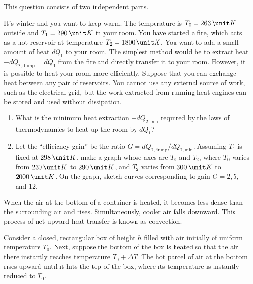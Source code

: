 \documentclass[11pt]{scrartcl}
\begin{document}
\begin{prob}[USAPhO 2021/B2]
    This question consists of two independent parts.
    \begin{anum}
        \item It’s winter and you want to keep warm. The temperature is $T_0 = 263\,\unit K$ outside and $T_1 = 290 \,\unit K$ in your room. You have started a fire, which acts as a hot reservoir at temperature $T_2 = 1800\,\unit K$. You want to add a small amount of heat $dQ_1$ to your room. The simplest method would be to extract heat $-dQ_{2,\text{dump}} = dQ_1$ from the fire and directly transfer it to your room. However, it is possible to heat your room more efficiently. Suppose that you can exchange heat between any pair of reservoirs. You cannot use any external source of work, such as the electrical grid, but the work extracted from running heat engines can be stored and used without dissipation.
        \begin{enumerate}[label=\roman*.]
            \item What is the minimum heat extraction $-dQ_{2,\text{min}}$ required by the laws of thermodynamics to heat up the room by $dQ_1$?
            \item Let the ``efficiency gain'' be the ratio $G=  dQ_{2,\text{dump}}/dQ_{2,\text{min}}$. Assuming $T_1$ is fixed at $298\,\unit K$, make a graph whose axes are $T_0$ and $T_2$, where $T_0$ varies from $230 \, \unit K$ to $290 \, \unit K$, and $T_2$ varies from $300 \, \unit K$ to $2000 \, \unit K$. On the graph, sketch curves corresponding to gain $G = 2,5$, and $12$.
        \end{enumerate}
        \item When the air at the bottom of a container is heated, it becomes less dense than the surrounding
air and rises. Simultaneously, cooler air falls downward. This process of net upward heat transfer
is known as convection.

Consider a closed, rectangular box of height $h$ filled with air initially of uniform temperature $T_0$.
Next, suppose the bottom of the box is heated so that the air there instantly reaches temperature
$T_0 +\Delta T$. The hot parcel of air at the bottom rises upward until it hits the top of the box, where
its temperature is instantly reduced to $T_0$.


\end{anum}
\end{prob}
\end{document}
